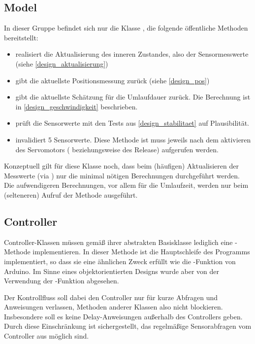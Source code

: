 \subsection{Model}
In dieser Gruppe befindet sich nur die Klasse , die folgende öffentliche Methoden bereitstellt:
\begin{itemize}
	\item {} realisiert die Aktualisierung des inneren Zustandes, also der Sensormesswerte (siehe \cref{design_aktualisierung})
	\item {} gibt die aktuellste Positionsmessung zurück (siehe \cref{design_pos})
	\item {} gibt die aktuellste Schätzung für die Umlaufdauer zurück.
	Die Berechnung ist in \cref{design_geschwindigkeit} beschrieben.
	\item {} prüft die Sensorwerte mit den Tests aus \cref{design_stabilitaet} auf Plausibilität.
	\item {} invalidiert 5 Sensorwerte.
	Diese Methode ist muss jeweils nach dem aktivieren des Servomotors ( beziehungsweise  des Release) aufgerufen werden.
\end{itemize}

Konzeptuell gilt für diese Klasse noch, dass beim (häufigen) Aktualisieren der Messwerte (via ) nur die minimal nötigen Berechnungen durchgeführt werden.
Die aufwendigeren Berechnungen, vor allem für die Umlaufzeit, werden nur beim (selteneren) Aufruf der Methode  ausgeführt.

\subsection{Controller}
Controller-Klassen müssen gemäß ihrer abstrakten Basisklasse  lediglich eine -Methode implementieren.
In dieser Methode ist die Hauptschleife des Programms implementiert, so dass sie eine ähnlichen Zweck erfüllt wie die -Funktion von Arduino.
Im Sinne eines objektorientierten Designs wurde aber von der Verwendung der -Funktion abgesehen.

Der Kontrollfluss soll dabei den Controller nur für kurze Abfragen und Anweisungen verlassen, Methoden anderer Klassen also nicht blockieren.
Insbesondere soll es keine Delay-Anweisungen außerhalb des Controllers geben.
Durch diese Einschränkung ist sichergestellt, das regelmäßige Sensorabfragen vom Controller aus möglich sind.

